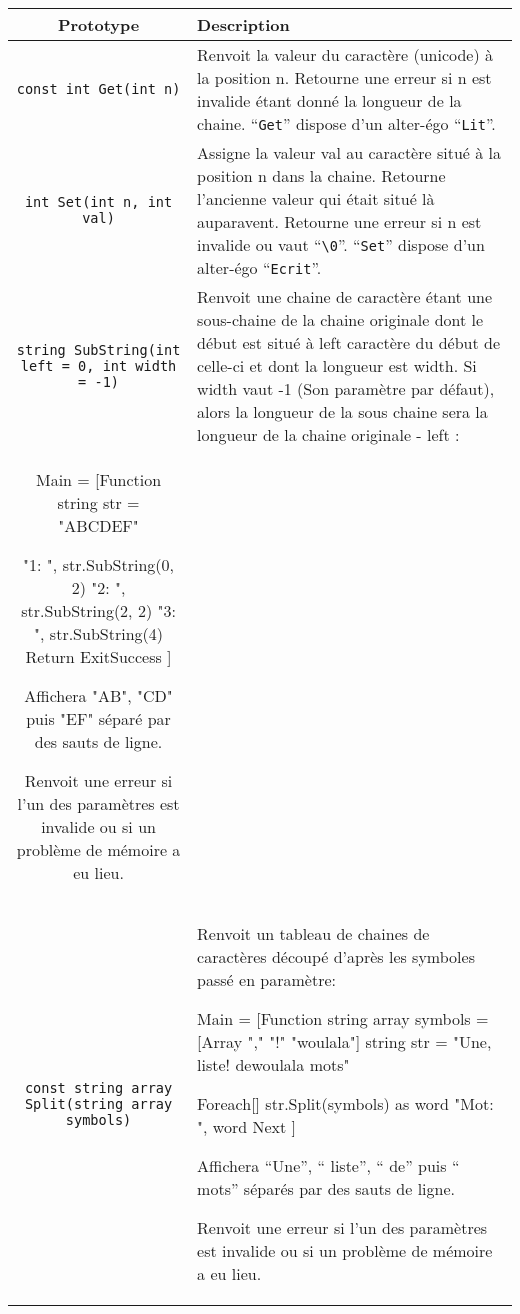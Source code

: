 \documentclass[a5paper, 12pt]{book}
\begin{document}
\begin{tabular}{|c|l|}
  \hline
  Prototype & Description \\
  \hline
  \verb!const int Get(int n)! &
  Renvoit la valeur du caractère (unicode) à la position n.
  Retourne une erreur si n est invalide étant donné la longueur de la chaine.
  ``\verb!Get!'' dispose d'un alter-égo ``\verb!Lit!''.\\
  \verb!int Set(int n, int val)! &
  Assigne la valeur val au caractère situé à la position n dans la chaine.
  Retourne l'ancienne valeur qui était situé là auparavent.
  Retourne une erreur si n est invalide ou vaut ``\verb!\0!''.
  ``\verb!Set!'' dispose d'un alter-égo ``\verb!Ecrit!''.\\
  \verb!string SubString(int left = 0, int width = -1)! &
  Renvoit une chaine de caractère étant une sous-chaine de la chaine originale
  dont le début est situé à left caractère du début de celle-ci et dont la
  longueur est width.
  Si width vaut -1 (Son paramètre par défaut), alors la longueur de la sous
  chaine sera la longueur de la chaine originale - left :\\

  Main = [Function
    string str = "ABCDEF"

    "1: ", str.SubString(0, 2)
    "2: ", str.SubString(2, 2)
    "3: ", str.SubString(4)
    Return ExitSuccess
  ]

  Affichera "AB", "CD" puis "EF" séparé par des sauts de ligne.

  Renvoit une erreur si l'un des paramètres est invalide ou
  si un problème de mémoire a eu lieu.
  \\
  \verb!const string array Split(string array symbols)! &
  Renvoit un tableau de chaines de caractères découpé d'après
  les symboles passé en paramètre:

  Main = [Function
    string array symbols = [Array "," "!" "{woulala}"]
    string str = "Une, liste! de{woulala} mots"

    Foreach[] str.Split(symbols) as word
      "Mot: ", word
    Next
  ]

  Affichera ``Une'', `` liste'', `` de'' puis `` mots'' séparés par
  des sauts de ligne.

  Renvoit une erreur si l'un des paramètres est invalide ou
  si un problème de mémoire a eu lieu. \\
  \hline
\end{tabular}
\end{document}
